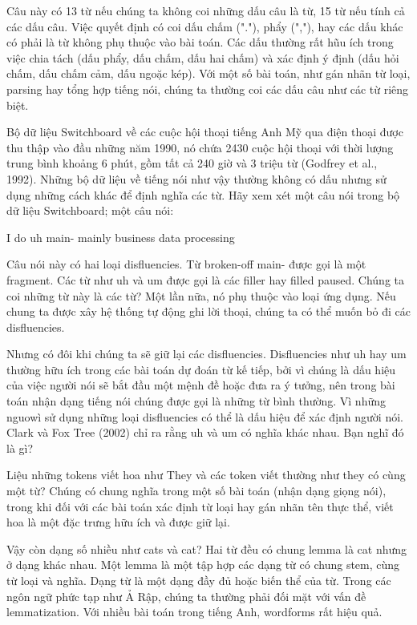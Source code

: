 Câu này có 13 từ nếu chúng ta không coi những dấu câu là từ, 15 từ nếu tính cả các dấu câu. Việc quyết định có coi dấu chấm ("."), phẩy (","), hay các dấu khác có phải là từ không phụ thuộc vào bài toán. Các dấu thường rất hũu ích trong việc chia tách (dấu phẩy, dấu chấm, dấu hai chấm) và xác định ý định (dấu hỏi chấm, dấu chấm cảm, dấu ngoặc kép). Với một số bài toán, như gán nhãn từ loại, parsing hay tổng hợp tiếng nói, chúng ta thường coi các dấu câu như các từ riêng biệt.

Bộ dữ liệu Switchboard về các cuộc hội thoại tiếng Anh Mỹ qua điện thoại được thu thập vào đầu những năm 1990, nó chứa 2430 cuộc hội thoại với thời lượng trung bình khoảng 6 phút, gồm tất cả 240 giờ và 3 triệu từ (Godfrey et al., 1992). Những bộ dữ liệu về tiếng nói như vậy thường không có dấu nhưng sử dụng những cách khác để định nghĩa các từ. Hãy xem xét một câu nói trong bộ dữ liệu Switchboard; một câu nói:

I do uh main- mainly business data processing

Câu nói này có hai loại disfluencies. Từ broken-off main- được gọi là một fragment. Các từ như uh và um được gọi là các filler hay filled paused. Chúng ta coi những từ này là các từ? Một lần nữa, nó phụ thuộc vào loại ứng dụng. Nếu chung ta được xây hệ thống tự động ghi lời thoại, chúng ta có thể muốn bỏ đi các disfluencies.

Nhưng có đôi khi chúng ta sẽ giữ lại các disfluencies. Disfluencies như uh hay um thường hữu ích trong các bài toán dự đoán từ kế tiếp, bởi vì chúng là dấu hiệu của việc người nói sẽ bắt đầu một mệnh đề hoặc đưa ra ý tưởng, nên trong bài toán nhận dạng tiếng nói chúng được gọi là những từ bình thường. Vì những nguowì sử dụng những loại disfluencies có thể là dấu hiệu để xác định người nói. Clark và Fox Tree (2002) chỉ ra rằng uh và um có nghĩa khác nhau. Bạn nghĩ đó là gì?

Liệu những tokens viết hoa như They và các token viết thường như they có cùng một từ? Chúng có chung nghĩa trong một số bài toán (nhận dạng giọng nói), trong khi đối với các bài toán xác định từ loại hay gán nhãn tên thực thể, viết hoa là một đặc trưng hữu ích và được giữ lại.

Vậy còn dạng số nhiều như cats và cat? Hai từ đều có chung lemma là cat nhưng ở dạng khác nhau. Một lemma là một tập hợp các dạng từ có chung stem, cùng từ loại và nghĩa. Dạng từ là một dạng đầy đủ hoặc biến thể của từ. Trong các ngôn ngữ phức tạp như Ả Rập, chúng ta thường phải đối mặt với vấn đề lemmatization. Với nhiều bài toán trong tiếng Anh, wordforms rất hiệu quả.

